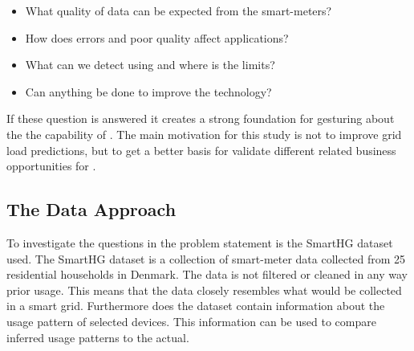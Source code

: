 \begin{itemize}
\item	What quality of data can be expected from the smart-meters?\\
	
\item	How does errors and poor quality affect  applications?\\
	
\item	What can we detect using   and where is the limits? \\
	
\item	Can anything be done to improve the  technology?
\end{itemize}
If these question is answered it creates a strong foundation for gesturing about the the capability of . The main motivation for this study is not to improve grid load predictions, but to get a better basis for validate different  related business opportunities for . 

\subsection{The Data Approach}
To investigate the questions in the problem statement is the SmartHG dataset used. The SmartHG dataset is a collection of smart-meter data collected from 25 residential households in Denmark. The data is not filtered or cleaned in any way prior usage. This means that the data closely resembles what would be collected in a smart grid. Furthermore does the dataset contain information about the usage pattern of selected devices. This information can be used to compare inferred usage patterns to the actual. 
